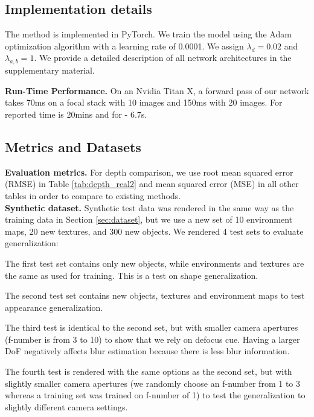 \documentclass[10pt,twocolumn,letterpaper]{article}
\begin{document}
\subsection{Implementation details}
The method is implemented in PyTorch\cite{pytorch}. We train the model using the
Adam optimization algorithm \cite{adam_opt} with a learning rate of 0.0001.
We assign $\lambda_{d}=0.02$ and $\lambda_{a,b}=1$. 
We provide a detailed description of all network architectures in the supplementary material.


\noindent\textbf{Run-Time Performance.} On an Nvidia Titan X, a forward pass of our network takes 70ms on a focal stack with 10 images and 150ms with 20 images. For \cite{Suwajanakorn15} reported time is 20mins and for \cite{Surh17} - 6.7s.



\subsection{Metrics and Datasets} \label{sec:test_dataset}

\noindent\textbf{Evaluation metrics.} For depth comparison, we use root mean squared error (RMSE) in Table \ref{tab:depth_real2} and mean squared error (MSE) in all other tables in order to compare to existing methods.\\


\vspace{-0.5cm}
\noindent\textbf{Synthetic dataset.}
Synthetic test data was rendered in the same way as the training data in Section \ref{sec:dataset}, but we use a new set of 10 environment maps, 20 new textures, and 300 new objects. 
We rendered 4 test sets to evaluate generalization: 



 The first test set contains only new objects, while environments and textures are the same as used for training. This is a test on shape generalization.

 The second test set contains new objects, textures and environment maps to test appearance generalization.

 The third test is identical to the second set, but with smaller camera apertures (f-number is from 3 to 10)  to show that we rely on defocus cue. Having a larger DoF negatively affects blur estimation because there is less blur information. 

 The fourth test is rendered with the same options as the second set, but with  slightly smaller camera apertures (we randomly choose an f-number from 1 to 3 whereas a training set was trained on f-number of 1) to test the generalization to slightly different camera settings. 
\end{document}
